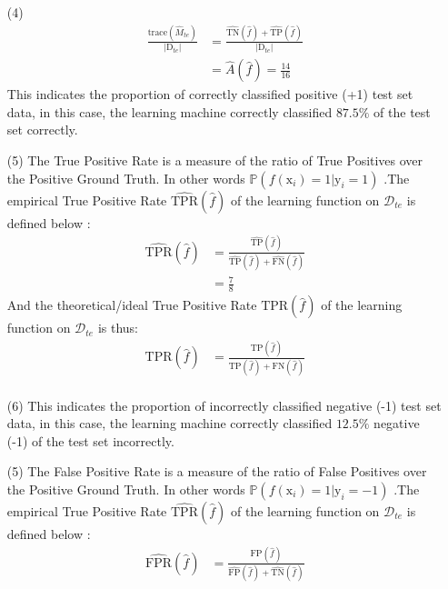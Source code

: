 \documentclass[12pt,a4paper]{article}
\begin{document}
\begin{enumerate}
		
	\item[(4)] 
			\begin{align*}
						\frac{\text{trace}(\widehat{M}_{te} ) }{|\text{D}_{te} |} &= \frac{  \widehat{ \text{TN} }(\widehat{f}) + \widehat{ \text{TP} }(\widehat{f})   }{ |\text{D}_{te} |}\\
						&=  \widehat{A}(\widehat{f})  =  \frac{14}{16} 
			\end{align*}
			This indicates the proportion of correctly classified positive (+1) test set data, in this case, the learning machine correctly classified $87.5\%$ of the test set correctly.
		\item[(5)] The True Positive Rate  is a measure of the ratio of True Positives over the Positive Ground Truth. In other words  $\mathbb{P} (f(\text{x}_i) = 1 | \text{y}_i = 1)$ .The empirical True Positive Rate $\widehat{\text{TPR}}(\widehat{f}) $ of the learning function  on $\mathscr{D}_{te} $ is defined below : 
					\begin{align*}
						\widehat{\text{TPR}}(\widehat{f}) &=  \frac{\widehat{ \text{TP} }(\widehat{f}) }{  \widehat{ \text{TP} }(\widehat{f})  + \widehat{ \text{FN} }(\widehat{f})  }\\
								&= \frac{7}{8}
			\end{align*}
		And the  theoretical/ideal True Positive Rate $\text{TPR}(\widehat{f}) $ of the learning function  on $\mathscr{D}_{te} $ is thus: 
		\begin{align*}
						\text{TPR}(\widehat{f}) &=  \frac{\text{TP} (\widehat{f}) }{  \text{TP} (\widehat{f})  + \text{FN} (\widehat{f})  }\\
			\end{align*}
	\item[(6)] This indicates the proportion of incorrectly classified  negative (-1) test set data, in this case, the learning machine correctly classified $12.5\%$  negative (-1) of the test set incorrectly.
		\item[(5)] The False Positive Rate  is a measure of the ratio of False Positives over the Positive Ground Truth.  In other words  $\mathbb{P} (f(\text{x}_i) = 1 | \text{y}_i = -1)$ .The empirical True Positive Rate $\widehat{\text{TPR}}(\widehat{f}) $ of the learning function  on $\mathscr{D}_{te} $ is defined below : 
					\begin{align*}
						\widehat{\text{FPR}}(\widehat{f}) &=  \frac{\widehat{ \text{FP} }(\widehat{f}) }{  \widehat{ \text{FP} }(\widehat{f})  + \widehat{ \text{TN} }(\widehat{f})  }\\

\end{align*}
\end{enumerate}
\end{document}
